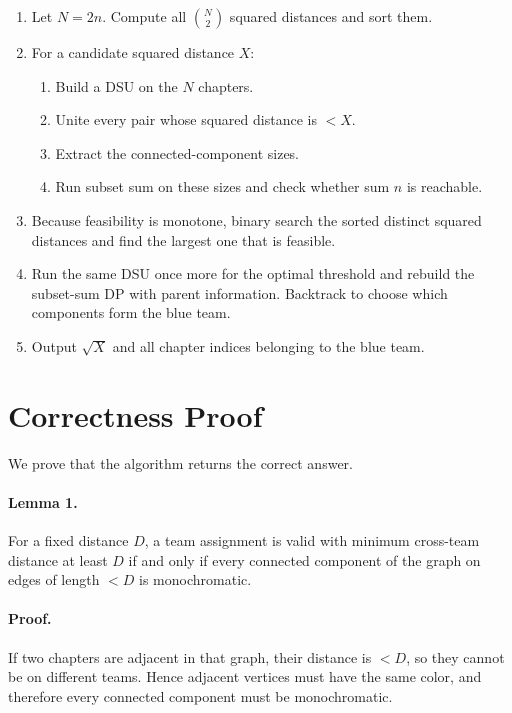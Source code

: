 \documentclass[11pt]{article}
\begin{document}
\begin{enumerate}[leftmargin=*]
    \item Let $N=2n$. Compute all $\binom{N}{2}$ squared distances and sort them.

    \item For a candidate squared distance $X$:
    \begin{enumerate}[leftmargin=*]
        \item Build a DSU on the $N$ chapters.
        \item Unite every pair whose squared distance is $< X$.
        \item Extract the connected-component sizes.
        \item Run subset sum on these sizes and check whether sum $n$ is reachable.
    \end{enumerate}

    \item Because feasibility is monotone, binary search the sorted distinct squared distances and find the largest one that is feasible.

    \item Run the same DSU once more for the optimal threshold and rebuild the subset-sum DP with parent information. Backtrack to choose which components form the blue team.

    \item Output $\sqrt{X}$ and all chapter indices belonging to the blue team.
\end{enumerate}

\section*{Correctness Proof}

We prove that the algorithm returns the correct answer.

\paragraph{Lemma 1.}
For a fixed distance $D$, a team assignment is valid with minimum cross-team distance at least $D$ if and only if every connected component of the graph on edges of length $< D$ is monochromatic.

\paragraph{Proof.}
If two chapters are adjacent in that graph, their distance is $< D$, so they cannot be on different teams. Hence adjacent vertices must have the same color, and therefore every connected component must be monochromatic.
\end{document}
